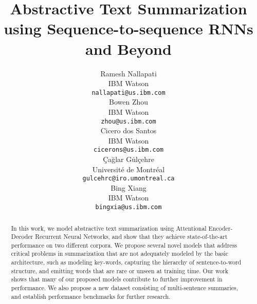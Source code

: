 \documentclass[11pt]{article}
\title{Abstractive Text Summarization using Sequence-to-sequence RNNs and Beyond}
\author{Ramesh Nallapati \\
   IBM Watson \\
   {\tt nallapati@us.ibm.com} \\\And
   Bowen Zhou \\
   IBM Watson \\
   {\tt zhou@us.ibm.com} \\\And
   Cicero  dos Santos \\
   IBM Watson \\
   {\tt cicerons@us.ibm.com} \\\AND
   \c{C}a\u{g}lar G\.{u}l\c{c}ehre \\
   Universit\'e de Montr\'eal \\
   {\tt gulcehrc@iro.umontreal.ca} \\\And
   Bing Xiang \\
   IBM Watson \\
   {\tt bingxia@us.ibm.com} \\
  }
\date{}
\begin{document}
\maketitle
\begin{abstract}
In this work, we model abstractive text summarization using Attentional Encoder-Decoder Recurrent Neural Networks, and show that they achieve state-of-the-art performance on two different corpora. We propose several novel models that address critical problems in summarization that are not adequately modeled by the basic architecture, such as modeling key-words, capturing the hierarchy of sentence-to-word structure, and emitting words that are rare or unseen at training time. Our work shows that many of our proposed models contribute to further improvement in performance. We also propose a new dataset consisting of multi-sentence summaries, and establish performance benchmarks for further research.
\end{abstract}








%
%


\end{document}
